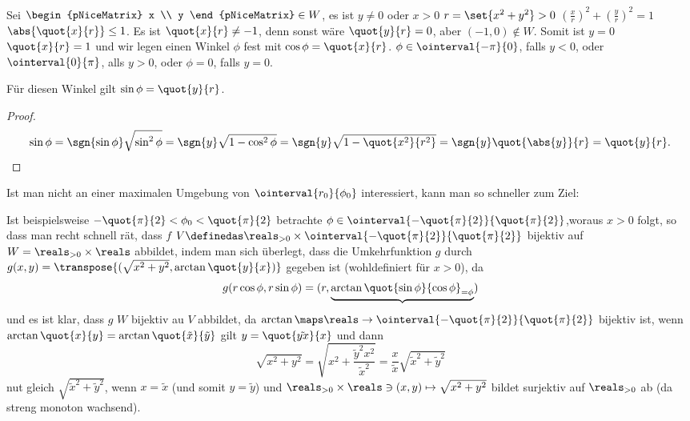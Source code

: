 \begin{beispiele}
\begin{enumerate}
\begin{beachte*}
       Sei \( \begin{pNiceMatrix} x \\ y \end{pNiceMatrix} \in W \), \dh es ist \( y\neq 0 \) oder \( x>0 \) \timplies \( r=\set{x^2+y^2}>0 \) \timplies \( \left( \frac{x}{r} \right)^2+\left( \frac{y}{r} \right)^2=1 \) \timplies \( \abs{\quot{x}{r}}\leq 1 \). Es ist \( \quot{x}{r}\neq -1 \), denn sonst wäre \( \quot{y}{r}=0 \), aber \( (-1,0)\notin W \). Somit ist \( y=0 \) \tiff \( \quot{x}{r}=1 \) und wir legen einen Winkel \( \phi \) fest mit \( \cos \phi=\quot{x}{r} \). \( \phi\in \ointerval{-\pi
        }{0} \), falls \( y<0 \), oder \( \ointerval{0}{\pi} \), alls \( y>0 \), oder \( \phi=0 \), falls \( y=0. \)

      \begin{behauptung*}
        Für diesen Winkel gilt \( \sin \phi=\quot{y}{r} \).
      \end{behauptung*}
      \begin{proof}
        \begin{equation*}
          \sin \phi=\sgn{\sin \phi}\sqrt{\sin^2 \phi}=\sgn{y}\sqrt{1-\cos^2 \phi}=\sgn{y}\sqrt{1-\quot{x^2}{r^2}}=\sgn{y}\quot{\abs{y}}{r}=\quot{y}{r}.
        \end{equation*}
      \end{proof}
      Ist man nicht an einer maximalen Umgebung von \( \ointerval{r_0}{\phi_0}  \) interessiert, kann man so schneller zum Ziel:

      Ist beispielsweise \( -\quot{\pi}{2}<\phi_0<\quot{\pi}{2} \) betrachte \( \phi\in \ointerval{-\quot{\pi}{2}}{\quot{\pi}{2}} \),woraus \( x>0 \) folgt, so dass man recht schnell rät, dass \( f \) \( V\definedas \reals_{>0}\times  \ointerval{-\quot{\pi}{2}}{\quot{\pi}{2}} \) bijektiv auf \( W=\reals_{>0}\times \reals \) abbildet, indem man sich überlegt, dass die Umkehrfunktion \( g \) durch \( g(x,y)=\transpose{(\sqrt{x^2+y^2}, \arctan \quot{y}{x})} \) gegeben ist (wohldefiniert für \( x>0 \)), da 
      \begin{equation*}
        g(r \cos \phi, r\sin \phi)=(r,\underbrace{\arctan \quot{\sin \phi}{\cos \phi}_{=\phi}})
      \end{equation*}
      und es ist klar, dass \( g \) \( W \) bijektiv au \( V \) abbildet, da \( \arctan\maps \reals\to \ointerval{-\quot{\pi}{2}}{\quot{\pi}{2}} \) bijektiv ist, \sd  wenn \( \arctan \quot{x}{y}=\arctan \quot{\tilde{x}}{\tilde{y}} \) gilt \( y=\quot{\tilde{yx}}{x} \) und dann
      \begin{equation*}
        \sqrt{x^2+y^2}=\sqrt{x^2+\frac{\tilde{y}^2 x^2}{\tilde{x}^2}}=\frac{x}{\tilde{x}}\sqrt{\tilde{x}^2+\tilde{y}^2}
      \end{equation*}
      nut gleich \( \sqrt{\tilde{x}^2+\tilde{y}^2} \), wenn \( x=\tilde{x} \) (und somit \( y= \tilde{y}\)) und \( \reals_{>0}\times\reals\ni (x,y)\mapsto \sqrt{x^2+y^2} \) bildet surjektiv auf \( \reals_{>0} \) ab (da streng monoton wachsend).
    \end{beachte*}
  \end{enumerate}
\end{beispiele}
